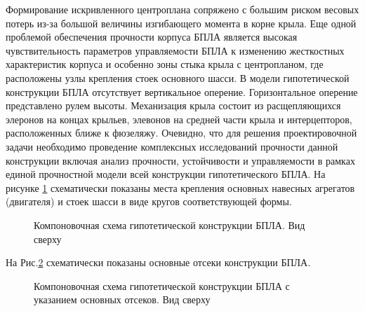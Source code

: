 Формирование искривленного центроплана сопряжено с большим риском весовых потерь из-за большой величины изгибающего момента в корне крыла. Еще одной проблемой обеспечения прочности корпуса БПЛА является высокая чувствительность параметров управляемости БПЛА к изменению жесткостных характеристик корпуса и особенно зоны стыка крыла с центропланом, где расположены узлы крепления стоек основного шасси. 
В модели гипотетической конструкции БПЛА отсутствует вертикальное оперение. Горизонтальное оперение представлено рулем высоты. Механизация крыла состоит из расщепляющихся элеронов на концах крыльев, элевонов на средней части крыла и интерцепторов, расположенных ближе к фюзеляжу. 
Очевидно, что для решения проектировочной задачи необходимо проведение комплексных исследований прочности данной конструкции включая анализ прочности, устойчивости и управляемости в рамках единой прочностной модели всей конструкции гипотетического БПЛА. 
На рисунке \ref{fig:BPS_Catia_Top_WithoutSkin} схематически показаны места крепления основных навесных агрегатов (двигателя) и стоек шасси в виде кругов соответствующей формы. 


\begin{figure}[H]
\centering
\def\svgwidth{0.9\textwidth}

\caption{Компоновочная схема гипотетической конструкции БПЛА. Вид сверху}
\label{fig:BPS_Catia_Top_WithoutSkin}
\end{figure}
 

На Рис.\ref{fig:BPS_Catia_Top_PartRoles} схематически показаны основные отсеки конструкции БПЛА. 

\begin{figure}[H]
\centering
\def\svgwidth{0.9\textwidth}

\caption{Компоновочная схема гипотетической конструкции БПЛА с указанием основных отсеков. Вид сверху}
\label{fig:BPS_Catia_Top_PartRoles}
\end{figure}
